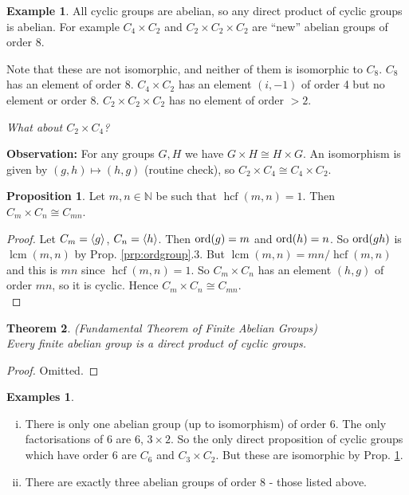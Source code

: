 \documentclass{article}
\newtheorem{theorem}{Theorem}
\theoremstyle{definition} \newtheorem*{definition}{Definition}
\newtheorem{proposition}[theorem]{Proposition}
\newtheorem*{exmp}{Example} \newtheorem*{exmps}{Examples}
\newcommand{\naturals}{\mathbb{N}} \newcommand{\complexes}{\mathbb{C}}
\newcommand{\ism}{\cong} \newcommand{\elemt}[2]{#1_{{#2}\sigma(#2)}}
\DeclareMathOperator{\lcm}{lcm} \DeclareMathOperator{\hcf}{hcf}
\begin{document}
\begin{exmp} All cyclic groups are abelian, so any direct product of cyclic
  groups is abelian. For example $C_4 \times C_2$ and $C_2 \times C_2 \times
  C_2$ are ``new'' abelian groups of order 8.

  Note that these are not isomorphic, and neither of them is isomorphic to
  $C_8$. $C_8$ has an element of order 8. $C_4 \times C_2$ has an element
  $(i,-1)$ of order 4 but no element or order 8.  $C_2 \times C_2 \times C_2$
  has no element of order $> 2$.

\end{exmp} \emph{What about $C_2 \times C_4$?}

  \textbf{Observation:} For any groups $G,H$ we have $G \times H \ism H \times
  G$. An isomorphism is given by $(g,h)\mapsto (h,g)$ (routine check), so $C_2
  \times C_4 \ism C_4 \times C_2$.\\

  \begin{proposition} \label{prp:hcfcyclic} Let $m,n \in \naturals$ be such
    that $\hcf(m,n)=1$. Then $C_m \times C_n \ism C_{mn}$.  \end{proposition}

  \begin{proof} Let $C_m = \langle g \rangle$, $C_n=\langle h \rangle$. Then $\operatorname{\text{ord}}(g)=m$ and
    $\operatorname{\text{ord}}(h)=n$. So $\operatorname{\text{ord}}(gh)$ is $\lcm(m,n)$ by Prop. \ref{prp:ordgroup}.3.
    But $\lcm(m,n)=mn/\hcf(m,n)$ and this is $mn$ since $\hcf(m,n)=1$. So $C_m
    \times C_n$ has an element $(h,g)$ of order $mn$, so it is cyclic. Hence
    $C_m \times C_n \ism C_{mn}$.\\ \end{proof} 

  \begin{theorem}(Fundamental Theorem of Finite Abelian Groups)\hfill\\ Every
    finite abelian group is a direct product of cyclic groups.
    \label{thm:funda} \end{theorem}

  \begin{proof} Omitted.  \end{proof}

  \begin{exmps}\hfill \begin{enumerate}[(i)] \item There is only one abelian group
            (up to isomorphism) of order 6. The only factorisations of 6 are 6,
            $3 \times 2$. So the only direct proposition of cyclic groups which
            have order 6 are $C_6$ and $C_3 \times C_2$. But these are
            isomorphic by Prop. \ref{prp:hcfcyclic}.  \item There are exactly
              three abelian groups of order 8 - those listed above.
          \end{enumerate} \end{exmps}
\end{document}
